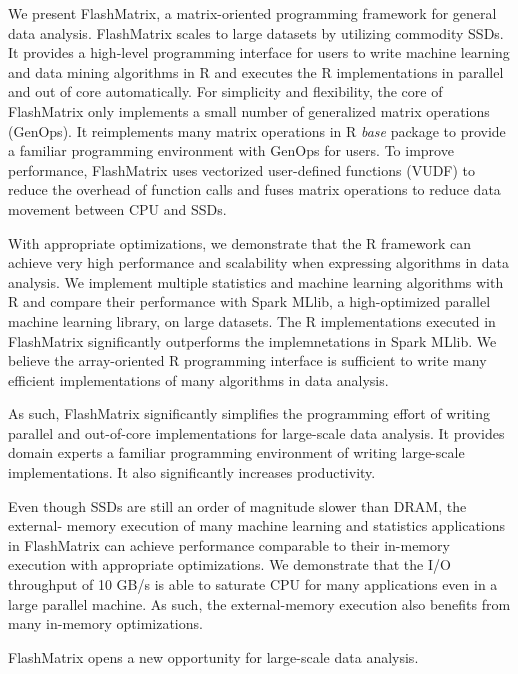 We present FlashMatrix, a matrix-oriented programming framework for general
data analysis. FlashMatrix scales to large datasets by utilizing commodity SSDs.
It provides a high-level programming interface
for users to write machine learning and data mining algorithms in R and
executes the R implementations in parallel and out of core automatically.
For simplicity and flexibility, the core of FlashMatrix only implements
a small number of generalized matrix operations (GenOps). It reimplements
many matrix operations in R \textit{base} package to provide a familiar
programming environment with GenOps for users. To improve performance,
FlashMatrix uses vectorized user-defined functions (VUDF) to reduce the
overhead of function calls and fuses matrix operations to reduce data movement
between CPU and SSDs.

With appropriate optimizations, we demonstrate that the R framework can achieve
very high performance and scalability when expressing algorithms in data
analysis. We implement multiple statistics and
machine learning algorithms with R and compare their performance with Spark
MLlib, a high-optimized parallel machine learning library, on large datasets.
The R implementations executed in FlashMatrix significantly outperforms
the implemnetations in Spark MLlib. We believe the array-oriented R programming
interface is sufficient to write many efficient implementations of many
algorithms in data analysis.

As such, FlashMatrix significantly simplifies the programming effort of writing
parallel and out-of-core implementations for large-scale data analysis. It
provides domain experts a familiar programming environment of writing large-scale
implementations. It also significantly increases productivity.

Even though SSDs are still an order of magnitude slower than DRAM, the external-
memory execution of many machine learning and statistics applications in
FlashMatrix can achieve performance comparable to their in-memory execution
with appropriate optimizations. We demonstrate that the I/O throughput of 10 GB/s
is able to saturate CPU for many applications even in a large parallel
machine. As such, the external-memory execution also benefits from many in-memory
optimizations.

FlashMatrix opens a new opportunity for large-scale data analysis.
